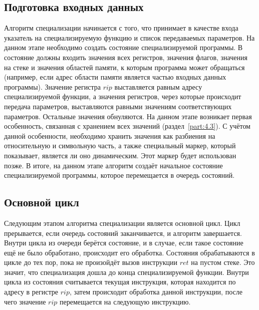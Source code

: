 \subsection{ Подготовка входных данных}
Алгоритм специализации начинается с того, что принимает в качестве входа указатель на специализируемую функцию и список передаваемых параметров. На данном этапе необходимо создать состояние специализируемой программы. В состояние должны входить значения всех регистров, значения флагов, значения на стеке и значения областей памяти, к которым программа может обращаться (например, если адрес области памяти является частью входных данных программы).
Значение регистра $rip$ выставляется равным адресу специализируемой функции, а значения регистров,
через которые происходит передача параметров, выставляются равными значениям соответствующих параметров.
Остальные значения обнуляются. На данном этапе возникает первая особенность, связанная с хранением всех значений (раздел~\ref{part:4.3}).
С учётом данной особенности, необходимо хранить значения как разбиения на относительную и символьную часть, а также специальный маркер, который показывает, является ли оно динамическим. Этот маркер будет использован позже. В итоге, на данном этапе алгоритм создаёт начальное состояние специализируемой программы, которое перемещается в очередь состояний.

\subsection{Основной цикл}
Следующим этапом алгоритма специализации является основной цикл.
Цикл прерывается, если очередь состояний заканчивается, и алгоритм завершается.
Внутри цикла из очереди берётся состояние, и в случае, если такое состояние ещё не было обработано, происходит его обработка.
Состояния обрабатываются в цикле до тех пор, пока не произойдёт вызов инструкции $ret$ на пустом стеке.
Это значит, что специализация дошла до конца специализируемой функции. Внутри цикла из состояния считывается текущая инструкция, которая находится по адресу в регистре $rip$, затем происходит обработка данной инструкции, после чего значение $rip$ перемещается на следующую инструкцию.

